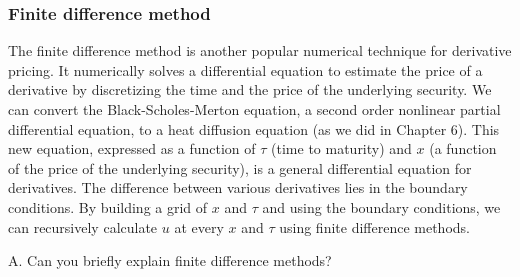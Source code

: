 \begin{solution}
\end{solution}

\subsubsection*{Finite difference method}

The finite difference method is another popular numerical technique for derivative pricing. It
numerically solves a differential equation to estimate the price of a derivative by discretizing
the time and the price of the underlying security. We can convert the Black-Scholes-Merton
equation, a second order nonlinear partial differential equation, to a heat diffusion equation (as
we did in Chapter 6). This new equation, expressed as a function of $\tau$ (time to maturity) and
$x$ (a function of the price of the underlying security), is a general differential equation for
derivatives. The difference between various derivatives lies in the boundary conditions. By building
a grid of $x$ and $\tau$ and using the boundary conditions, we can recursively calculate $u$ at every
$x$ and $\tau$ using finite difference methods.

\begin{problem}{A. Can you briefly explain finite difference methods?}
\end{problem}

